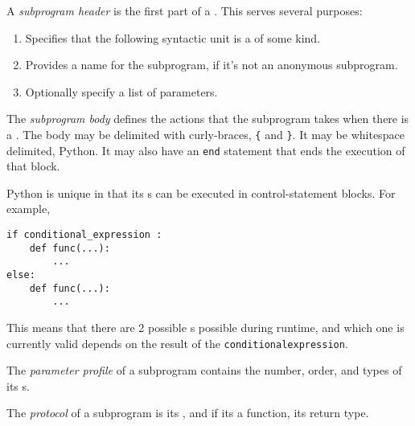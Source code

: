 \begin{definition}\label{def:Subprogram_Header}
  A \emph{subprogram header} is the first part of a .
  This serves several purposes:
  \begin{enumerate}[noitemsep]
  \item Specifies that the following syntactic unit is a  of some kind.
  \item Provides a name for the subprogram, if it's not an anonymous subprogram.
  \item Optionally specify a list of parameters.
  \end{enumerate}
\end{definition}

\begin{definition}\label{def:Subprogram_Body}
  The \emph{subprogram body} defines the actions that the subprogram takes when there is a .
  The body may be delimited with curly-braces, \texttt{\{} and \texttt{\}}.
  It may be whitespace delimited, Python.
  It may also have an \texttt{end} statement that ends the execution of that block.
\end{definition}

Python is unique in that its s can be executed in control-statement blocks.
For example,
\begin{verbatim}
if conditional_expression :
    def func(...):
        ...
else:
    def func(...):
        ...
\end{verbatim}
This means that there are 2 possible s possible during runtime, and which one is currently valid depends on the result of the \texttt{conditional\textunderscore{}expression}.

\begin{definition}\label{def:Subprogram_Parameter_Profile}
  The \emph{parameter profile} of a subprogram contains the number, order, and types of its s.
\end{definition}

\begin{definition}[Protocol]\label{def:Subprogram_Protocol}
  The \emph{protocol} of a subprogram is its , and if its a function, its return type.
\end{definition}

